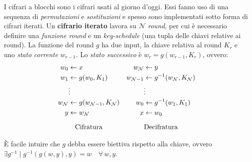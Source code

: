 \vspace{0.2cm} \noindent I cifrari a blocchi sono i cifrari usati al giorno d'oggi. Essi fanno uso di una sequenza di \emph{permutazioni} e \emph{sostituzioni} e spesso sono implementati sotto forma di cifrari iterati. Un \textbf{cifrario iterato} lavora su $\mathcal{N}$ \textit{round}, per cui è necessario definire una \emph{funzione round} e un \emph{key-schedule} (una tupla delle chiavi relative ai round). La funzione del round $g$ ha due input, la chiave relativa al round $K_r$ e uno \emph{stato corrente} $w_{r-1}$. Lo \emph{stato successivo} è $w_r=g(w_{r-1},K_r)$, ovvero:
\[
\begin{array}{c c}
\begin{aligned}
w_0     &\leftarrow x \\
w_1     &\leftarrow g(w_0, K_1) \\
        &\vdots \\
w_{\mathcal{N}}     &\leftarrow g(w_{\mathcal{N}-1}, K_{\mathcal{N}}) \\
y       &\leftarrow w_{\mathcal{N}}
\end{aligned}
&
\begin{aligned}
w_{\mathcal{N}}     &\leftarrow y \\
w_{\mathcal{N}-1}&\leftarrow g^{-1}(w_{\mathcal{N}}, K_{\mathcal{N}}) \\
        &\vdots \\
w_0     &\leftarrow g^{-1}(w_{1}, K_1) \\
x       &\leftarrow w_0
\end{aligned}
\\[1.5cm]
\text{Cifratura} & \text{Decifratura}
\end{array}
\]

\noindent È facile intuire che $g$ debba essere biettiva rispetto alla chiave, ovvero $\exists g^{-1} \mid g^{-1}(g(w,y),y)=w \quad \forall\, w,y$.




